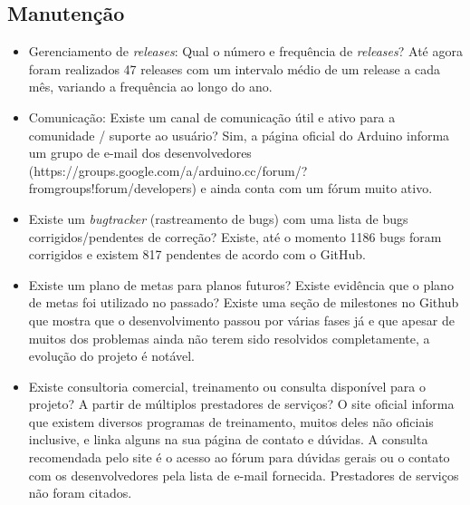 \documentclass[12pt,a4paper]{article} %
\begin{document}
\subsection{Manutenção}


\begin{itemize}
\item Gerenciamento de \textit{releases}: Qual o número e frequência de \textit{releases}?
\subitem Até agora foram realizados 47 releases com um intervalo médio de um release a cada mês, variando a frequência ao longo do ano.
\\
\item Comunicação: Existe um canal de comunicação útil e ativo para a comunidade / suporte ao usuário?
\subitem Sim, a página oficial do Arduino informa um grupo de e-mail dos desenvolvedores (https://groups.google.com/a/arduino.cc/forum/?fromgroups!forum/developers) e ainda conta com um fórum muito ativo.
\\
\item Existe um \textit{bugtracker} (rastreamento de bugs) com uma lista de bugs corrigidos/pendentes de correção?
\subitem Existe, até o momento 1186 bugs foram corrigidos e existem 817 pendentes de acordo com o GitHub.
\\
\item Existe um plano de metas para planos futuros? Existe evidência que o plano de metas foi utilizado no passado?
\subitem Existe uma seção de milestones no Github que mostra que o desenvolvimento passou por várias fases já e que apesar de muitos dos problemas ainda não terem sido resolvidos completamente, a evolução do projeto é notável.
\\
\item Existe consultoria comercial, treinamento ou consulta disponível para o projeto? A partir de múltiplos prestadores de serviços?
\subitem O site oficial informa que existem diversos programas de treinamento, muitos deles não oficiais inclusive, e linka alguns na sua página de contato e dúvidas. A consulta recomendada pelo site é o acesso ao fórum para dúvidas gerais ou o contato com os desenvolvedores pela lista de e-mail fornecida. Prestadores de serviços não foram citados.
\\
\end{itemize}
        

\par\vspace{\baselineskip}

\end{document}

